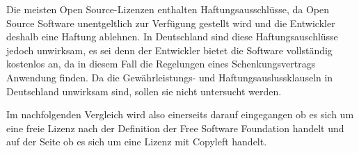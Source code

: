 Die meisten Open Source-Lizenzen enthalten Haftungsausschl\"usse, da Open Source Software unentgeltlich zur Verf\"ugung gestellt wird und die Entwickler deshalb eine Haftung ablehnen.  %
In Deutschland sind diese Haftungsauschl\"usse jedoch unwirksam, es sei denn der Entwickler bietet die Software vollst\"andig kostenlos an, da in diesem Fall die Regelungen eines Schenkungsvertrags Anwendung finden.  %
Da die Gew\"ahrleistungs- und Haftungsauslussklauseln in Deutschland unwirksam sind, sollen sie nicht untersucht werden.

Im nachfolgenden Vergleich wird also einerseits darauf eingegangen ob es sich um eine freie Lizenz nach der Definition der Free Software Foundation handelt und auf der Seite ob es sich um eine Lizenz mit Copyleft handelt. 